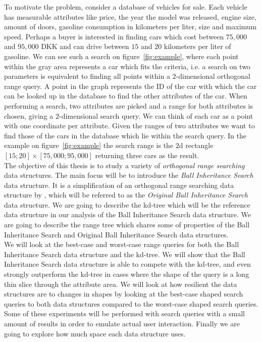 \noindent To motivate the problem, consider a database of vehicles for sale. Each vehicle has measurable attributes like price, the year the model was released, engine size, amount of doors, gasoline consumption in kilometers per liter, size  and maximum speed. Perhaps a buyer is interested in finding cars which cost between $75,000$ and $95,000$ DKK and can drive between $15$ and $20$ kilometers per liter of gasoline. We can see such a search on figure~\ref{fig:example}, where each point within the gray area represents a car which fits the criteria, i.e. a search on two parameters is equivalent to finding all points within a $2$-dimensional orthogonal range query. A point in the graph represents the ID of the car with which the car can be looked up in the database to find the other attributes of the car. When performing a search, two attributes are picked and a range for both attributes is chosen, giving a $2$-dimensional search query. We can think of each car as a point with one coordinate per attribute. Given the ranges of two attributes we want to find those of the cars in the database which lie within the search query. In the example on figure~\ref{fig:example} the search range is the $2$d rectangle $[15;20] \times [75,000;95,000]$ returning three cars as the result. \\

The objective of this thesis is to study a variety of \emph{orthogonal range searching} data structures. The main focus will be to introduce the \emph{Ball Inheritance Search} data structure. It is a simplification of an orthogonal range searching data structure by \citet{chanetal}, which will be referred to as the \emph{Original Ball Inheritance Search} data structure. We are going to describe the kd-tree which will be the reference data structure in our analysis of the Ball Inheritance Search data structure. We are going to describe the range tree which shares some of properties of the Ball Inheritance Search and Original Ball Inheritance Search data structures. \\

We will look at the best-case and worst-case range queries for both the Ball Inheritance Search data structure and the kd-tree. We will show that the Ball Inheritance Search data structure is able to compete with the kd-tree, and even strongly outperform the kd-tree in cases where the shape of the query is a long thin slice through the attribute area. We will look at how resilient the data structures are to changes in shapes by looking at the best-case shaped search queries to both data structures compared to the worst-case shaped search queries. Some of these experiments will be performed with search queries with a small amount of results in order to emulate actual user interaction. Finally we are going to explore how much space each data structure uses. \\ 


